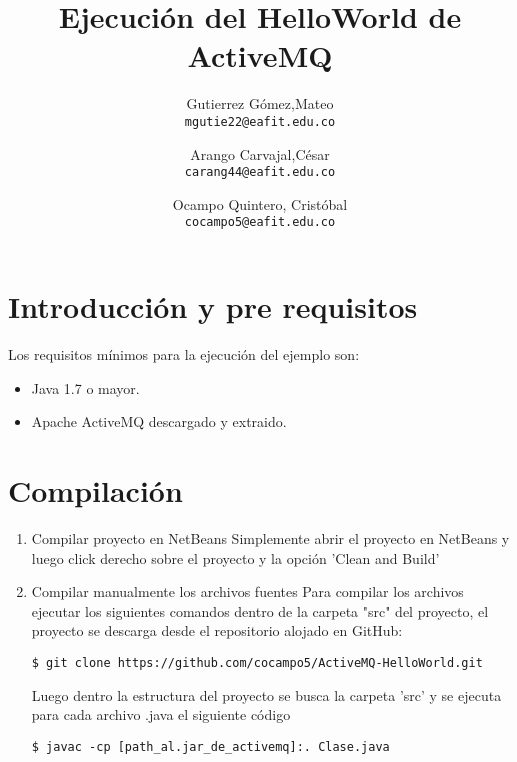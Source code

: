 \documentclass[]{article}
\title{Ejecución del HelloWorld de ActiveMQ}
\author{
  Gutierrez Gómez,Mateo\\
  \texttt{mgutie22@eafit.edu.co}
  \and
  Arango Carvajal,César\\
  \texttt{carang44@eafit.edu.co}
  \and
  Ocampo Quintero, Cristóbal\\
  \texttt{cocampo5@eafit.edu.co}
}
\begin{document}
\maketitle
\tableofcontents

\section{Introducción y pre requisitos}
Los requisitos mínimos para la ejecución del ejemplo son:
\begin{itemize}
\item Java 1.7 o mayor.
\item Apache ActiveMQ descargado y extraido.
\end{itemize}
\section{Compilación}
\begin{enumerate}
\item Compilar proyecto en NetBeans
Simplemente abrir el proyecto en NetBeans y luego click derecho sobre el proyecto y la opción 'Clean and Build'
\item Compilar manualmente los archivos fuentes
Para compilar los archivos ejecutar los siguientes comandos dentro de la carpeta "src" del proyecto, el proyecto se descarga desde el repositorio alojado en GitHub:
\lstset{language=bash} 
\begin{lstlisting}
$ git clone https://github.com/cocampo5/ActiveMQ-HelloWorld.git
\end{lstlisting}
Luego dentro la estructura del proyecto se busca la carpeta 'src' y se ejecuta para cada archivo .java el siguiente código
\begin{lstlisting}
$ javac -cp [path_al.jar_de_activemq]:. Clase.java
\end{lstlisting}
\end{enumerate}
\end{document}
